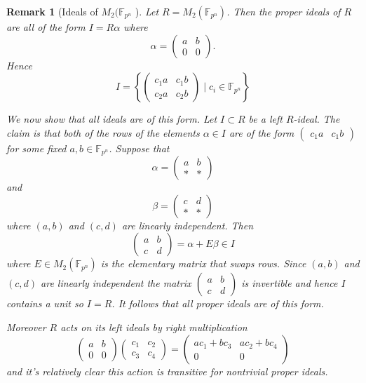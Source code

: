 \documentclass[10pt]{article}
\theoremstyle{plain}
\newtheorem{remark}[theorem]{Remark}
\theoremstyle{definition}
\newcommand{\F}{\mathbb{F}}
\begin{document}
\begin{remark}[Ideals of \( M_2(\F_{p^n} \) ]
    Let \( R =  M_2(\F_{p^n}) \).
    Then the proper ideals of \( R \) are all of the form \( I = R\alpha \) where
    \[
        \alpha =
        \begin{pmatrix}
            a & b \\
            0 & 0
        \end{pmatrix}.
    \]
    Hence
    \[
        I = \left\{ \begin{pmatrix}
            c_1a & c_1b \\
            c_2a & c_2b
        \end{pmatrix} \mid c_i \in \F_{p^n} \right\}
    \]

    We now show that all ideals are of this form.
    Let \( I \subset R \) be a left \( R \)-ideal.
    The claim is that both of the rows of the elements \( \alpha \in I \) are of the form \( \begin{pmatrix} c_1a & c_1b\end{pmatrix} \) for some fixed \( a, b \in \F_{p^n} \).
    Suppose that
    \[
        \alpha =  \begin{pmatrix}
            a & b \\
            * & *
        \end{pmatrix}
    \]
    and
    \[
        \beta = \begin{pmatrix}
            c & d \\
            * & *
        \end{pmatrix}
    \]
    where \( (a, b) \) and \( (c, d) \) are linearly independent.
    Then
    \[
        \begin{pmatrix}
            a & b \\
            c & d
        \end{pmatrix} = \alpha + E \beta \in I
    \]
    where \( E \in M_2(\F_{p^n}) \) is the elementary matrix that swaps rows.
    Since \( (a, b) \) and \( (c, d) \) are linearly independent the matrix \( \begin{pmatrix}
        a & b \\
        c & d
    \end{pmatrix} \) is invertible and hence \( I \) contains a unit so \( I = R \).
    It follows that all proper ideals are of this form.

    Moreover \( R \) acts on its left ideals by right multiplication
    \[
        \begin{pmatrix}
            a & b \\
            0 & 0
        \end{pmatrix}
        \begin{pmatrix}
            c_1 & c_2 \\
            c_3 & c_4
        \end{pmatrix}
        =
        \begin{pmatrix}
            ac_1 + bc_3 & ac_2 + bc_4 \\
            0           & 0
        \end{pmatrix}
    \]
    and it's relatively clear this action is transitive for nontrivial proper ideals.

\end{remark}
\end{document}
